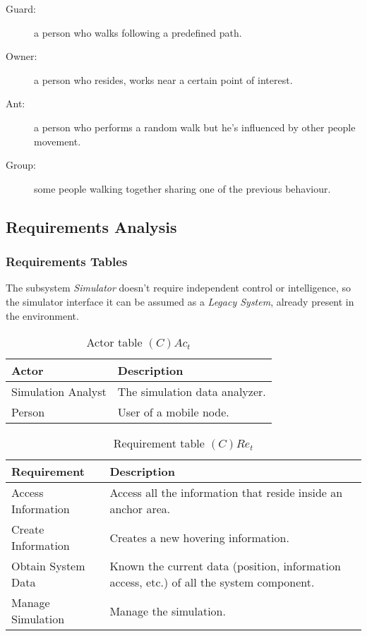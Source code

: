 \begin{description}
	\item[Guard:] a person who walks following a predefined path.
	\item[Owner:] a person who resides, works near a certain point of interest.
	\item[Ant:] a person who performs a random walk but he's influenced by other
		people movement.
	\item[Group:] some people walking together sharing one of the previous
		behaviour.
\end{description}

\subsection{Requirements Analysis}

\subsubsection*{Requirements Tables}

The subsystem \emph{Simulator} doesn't require independent control or
intelligence, so the simulator interface it can be assumed as a \emph{Legacy
System}, already present in the environment.

\begin{table}[H]
	\centering
	\begin{tabular}{|p{4cm}|p{8cm}|}
			\hline
			\textbf{Actor} & \textbf{Description} \\
			\hline
			Simulation Analyst & The simulation data analyzer. \\
			\hline
			Person & User of a mobile node. \\
			\hline
		\end{tabular}
	\caption{Actor table $(C)Ac_t$}
	\label{tab:cact}
\end{table}

\begin{table}[H]
	\centering
	\begin{tabular}{|p{4cm}|p{8cm}|}
			\hline
			\textbf{Requirement} & \textbf{Description} \\
			\hline
			Access Information & Access all the information that reside inside an anchor area. \\
			\hline
			Create Information & Creates a new hovering information. \\
			\hline
			Obtain System Data & Known the current data (position, information access,
			etc.) of all the system component. \\
			\hline
			Manage Simulation & Manage the simulation. \\
			\hline
		\end{tabular}
	\caption{Requirement table $(C)Re_t$}
	\label{tab:cact}
\end{table}

